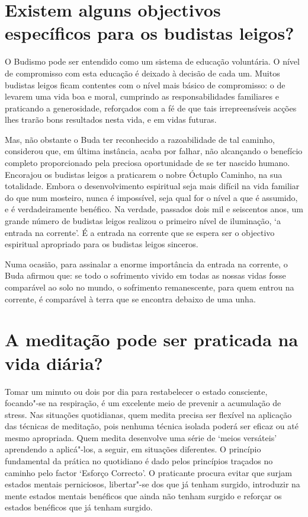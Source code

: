 \section{Existem alguns objectivos específicos para os budistas leigos?}

O Budismo pode ser entendido como um sistema de educação voluntária. O
nível de compromisso com esta educação é deixado à decisão de cada um.
Muitos budistas leigos ficam contentes com o nível mais básico de
compromisso: o de levarem uma vida boa e moral, cumprindo as
responsabilidades familiares e praticando a generosidade, reforçados com
a fé de que tais irrepreensíveis acções lhes trarão bons resultados
nesta vida, e em vidas futuras.

Mas, não obstante o Buda ter reconhecido a razoabilidade de tal caminho,
considerou que, em última instância, acaba por falhar, não alcançando o
benefício completo proporcionado pela preciosa oportunidade de se ter
nascido humano. Encorajou os budistas leigos a praticarem o nobre
Óctuplo Caminho, na sua totalidade. Embora o desenvolvimento espiritual
seja mais difícil na vida familiar do que num mosteiro, nunca é
impossível, seja qual for o nível a que é assumido, e é verdadeiramente
benéfico. Na verdade, passados dois mil e seiscentos anos, um grande
número de budistas leigos realizou o primeiro nível de iluminação, `a
entrada na corrente'. É a entrada na corrente que se espera ser o
objectivo espiritual apropriado para os budistas leigos sinceros.

Numa ocasião, para assinalar a enorme importância da entrada na
corrente, o Buda afirmou que: se todo o sofrimento vivido em todas as
nossas vidas fosse comparável ao solo no mundo, o sofrimento
remanescente, para quem entrou na corrente, é comparável à terra que se
encontra debaixo de uma unha.

\section{A meditação pode ser praticada na vida diária?}

Tomar um minuto ou dois por dia para restabelecer o estado consciente,
focando"-se na respiração, é um excelente meio de prevenir a acumulação
de stress. Nas situações quotidianas, quem medita precisa ser flexível
na aplicação das técnicas de meditação, pois nenhuma técnica isolada
poderá ser eficaz ou até mesmo apropriada. Quem medita desenvolve uma
série de `meios versáteis' aprendendo a aplicá"-los, a seguir, em
situações diferentes. O princípio fundamental da prática no quotidiano é
dado pelos princípios traçados no caminho pelo factor `Esforço
Correcto'. O praticante procura evitar que surjam estados mentais
perniciosos, libertar"-se dos que já tenham surgido, introduzir na mente
estados mentais benéficos que ainda não tenham surgido e reforçar os
estados benéficos que já tenham surgido.
